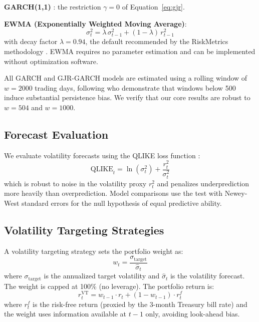 \textbf{GARCH(1,1)} \citep{bollerslev1986}: the restriction $\gamma = 0$ of Equation~\eqref{eq:gjr}.

\textbf{EWMA (Exponentially Weighted Moving Average)}:
\begin{equation}
\sigma_t^2 = \lambda \, \sigma_{t-1}^2 + (1 - \lambda) \, r_{t-1}^2
\label{eq:ewma}
\end{equation}
with decay factor $\lambda = 0.94$, the default recommended by the RiskMetrics methodology \citep{jpmorgan1996}. EWMA requires no parameter estimation and can be implemented without optimization software.

All GARCH and GJR-GARCH models are estimated using a rolling window of $w = 2000$ trading days, following \citet{hwang2006} who demonstrate that windows below 500 induce substantial persistence bias. We verify that our core results are robust to $w = 504$ and $w = 1000$.

\subsection{Forecast Evaluation}

We evaluate volatility forecasts using the QLIKE loss function \citep{patton2011}:
\begin{equation}
\text{QLIKE}_t = \ln(\sigma_t^2) + \frac{r_t^2}{\sigma_t^2}
\label{eq:qlike}
\end{equation}
which is robust to noise in the volatility proxy $r_t^2$ and penalizes underprediction more heavily than overprediction. Model comparisons use the \citet{diebold1995} test with Newey-West standard errors for the null hypothesis of equal predictive ability.

\subsection{Volatility Targeting Strategies}

A volatility targeting strategy sets the portfolio weight as:
\begin{equation}
w_t = \frac{\sigma_{\text{target}}}{\hat{\sigma}_t}
\label{eq:vt}
\end{equation}
where $\sigma_{\text{target}}$ is the annualized target volatility and $\hat{\sigma}_t$ is the volatility forecast. The weight is capped at 100\% (no leverage). The portfolio return is:
\begin{equation}
r_t^{\text{VT}} = w_{t-1} \cdot r_t + (1 - w_{t-1}) \cdot r_t^{f}
\label{eq:vt_return}
\end{equation}
where $r_t^{f}$ is the risk-free return (proxied by the 3-month Treasury bill rate) and the weight uses information available at $t-1$ only, avoiding look-ahead bias.

